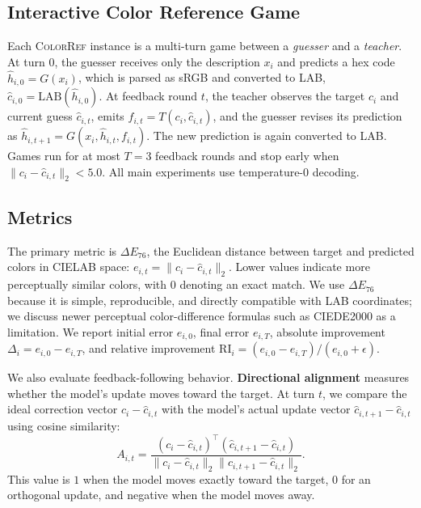 \documentclass[11pt]{article}
\begin{document}
\subsection{Interactive Color Reference Game}
\label{sec:game}

Each \textsc{ColorRef} instance is a multi-turn game between a
\emph{guesser} and a \emph{teacher}. At turn $0$, the guesser receives only
the description $x_i$ and predicts a hex code $\hat{h}_{i,0}=G(x_i)$, which
is parsed as sRGB and converted to LAB,
$\hat{c}_{i,0}=\mathrm{LAB}(\hat{h}_{i,0})$. At feedback round $t$, the
teacher observes the target $c_i$ and current guess $\hat{c}_{i,t}$, emits
$f_{i,t}=T(c_i,\hat{c}_{i,t})$, and the guesser revises its prediction as
$\hat{h}_{i,t+1}=G(x_i,\hat{h}_{i,t},f_{i,t})$. The new prediction is again
converted to LAB. Games run for at most $T=3$ feedback rounds and stop early
when $\lVert c_i-\hat{c}_{i,t}\rVert_2<5.0$. All main experiments use
temperature-$0$ decoding.

\subsection{Metrics}
\label{sec:metrics}

The primary metric is $\Delta E_{76}$, the Euclidean distance between target
and predicted colors in CIELAB space:
$e_{i,t}=\lVert c_i-\hat{c}_{i,t}\rVert_2$. Lower values indicate more
perceptually similar colors, with $0$ denoting an exact match. We use
$\Delta E_{76}$ because it is simple, reproducible, and directly compatible
with LAB coordinates; we discuss newer perceptual color-difference formulas
such as CIEDE2000 as a limitation. We report initial error $e_{i,0}$, final
error $e_{i,T}$, absolute improvement
$\Delta_i=e_{i,0}-e_{i,T}$, and relative improvement
$\mathrm{RI}_i=(e_{i,0}-e_{i,T})/(e_{i,0}+\epsilon)$.

We also evaluate feedback-following behavior. \textbf{Directional alignment}
measures whether the model's update moves toward the target. At turn $t$, we
compare the ideal correction vector $c_i-\hat{c}_{i,t}$ with the model's
actual update vector $\hat{c}_{i,t+1}-\hat{c}_{i,t}$ using cosine similarity:
\begin{equation}
        A_{i,t} =
    \frac{(c_i - \hat{c}_{i,t})^\top
    (\hat{c}_{i,t+1} - \hat{c}_{i,t})}
    {\lVert c_i - \hat{c}_{i,t} \rVert_2
     \lVert \hat{c}_{i,t+1} - \hat{c}_{i,t} \rVert_2}.
\end{equation}
This value is $1$ when the model moves exactly toward the target, $0$ for an
orthogonal update, and negative when the model moves away.
\end{document}
